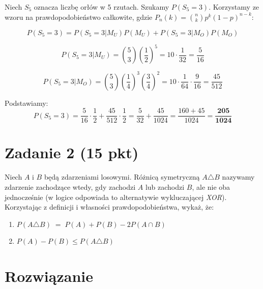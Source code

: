 \documentclass[polish, 10pt]{extarticle}
\theoremstyle{definition}
\begin{document}
\begin{enumerate}[label=\alph*)]
    Niech $S_5$ oznacza liczbę orłów w 5 rzutach. Szukamy $P(S_5=3)$.
    Korzystamy ze wzoru na prawdopodobieństwo całkowite, gdzie $P_n(k) = \binom{n}{k}p^k(1-p)^{n-k}$:
    
    \[
    P(S_5=3) = P(S_5=3|M_U)P(M_U) + P(S_5=3|M_O)P(M_O)
    \]
    
    \[
    P(S_5=3|M_U) = \binom{5}{3}\left(\frac{1}{2}\right)^5 = 10 \cdot \frac{1}{32} = \frac{5}{16}
    \]
    
    \[
    P(S_5=3|M_O) = \binom{5}{3}\left(\frac{1}{4}\right)^3\left(\frac{3}{4}\right)^2 = 10 \cdot \frac{1}{64} \cdot \frac{9}{16} = \frac{45}{512}
    \]
    
    Podstawiamy:
    \[
    P(S_5=3) = \frac{5}{16} \cdot \frac{1}{2} + \frac{45}{512} \cdot \frac{1}{2} = \frac{5}{32} + \frac{45}{1024} = \frac{160 + 45}{1024} = \mathbf{\frac{205}{1024}}
    \]
\end{enumerate}

\section*{Zadanie 2 (15 pkt)}
Niech \(A\) i \(B\) będą zdarzeniami losowymi.
Różnicą symetryczną \(A \triangle B\) nazywamy zdarzenie zachodzące wtedy, gdy zachodzi \(A\) lub zachodzi \(B\), ale nie oba jednocześnie (w logice odpowiada to alternatywie wykluczającej \emph{XOR}). Korzystając z definicji i własności prawdopodobieństwa, wykaż, że:
\begin{enumerate}
\item $P(A \triangle B) \;=\; P(A) + P(B) - 2P(A \cap B)$
\item $P(A) - P(B) \leq P(A \triangle B)$
\end{enumerate}
\section*{Rozwiązanie}
\end{document}
